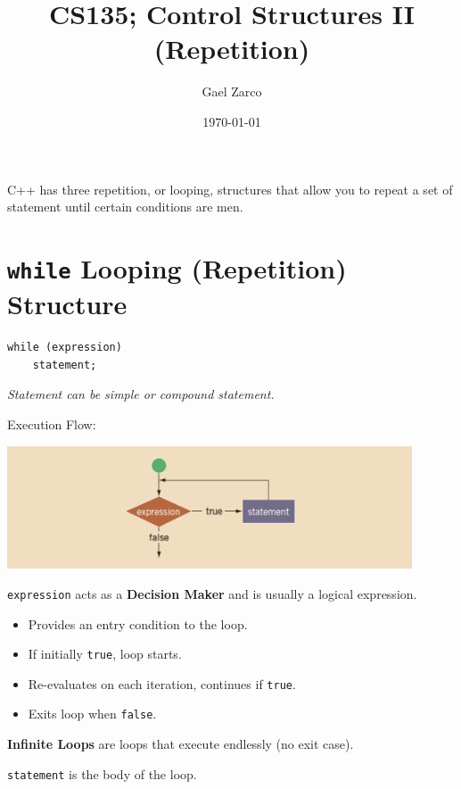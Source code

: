 \documentclass{article}
\title{CS135; Control Structures II (Repetition)}
\author{Gael Zarco}
\date{\today}
\begin{document}
\maketitle

C++ has three repetition, or looping, structures that allow you to repeat a set of statement until certain conditions are men.

\section{\texttt{while} Looping (Repetition) Structure}

\begin{lstlisting}[caption={\texttt{while} Loop Syntax}]
while (expression)
	statement;
\end{lstlisting}
\textit{Statement can be simple or compound statement.}

\vspace{8pt}
Execution Flow:
\begin{center}
    \includegraphics[width=0.9\textwidth]{while-exec-flow.png}
\end{center}

\vspace{8pt}
\texttt{expression} acts as a \textbf{Decision Maker} and is usually a logical expression.
\begin{itemize}
    \item Provides an entry condition to the loop.
    \item If initially \texttt{true}, loop starts.
    \item Re-evaluates on each iteration, continues if \texttt{true}.
    \item Exits loop when \texttt{false}.
\end{itemize}

\textbf{Infinite Loops} are loops that execute endlessly (no exit case).

\vspace{8pt}
\texttt{statement} is the body of the loop.
\end{document}
